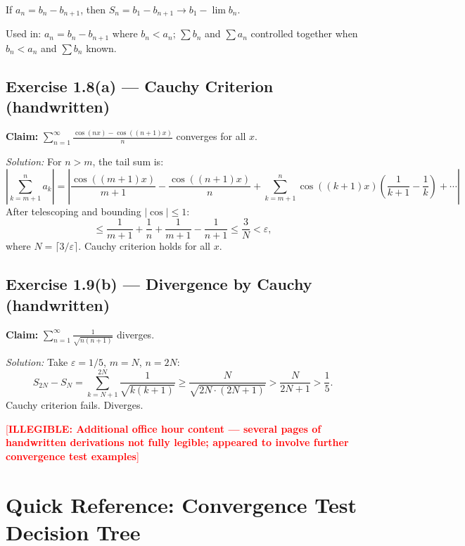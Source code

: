 \documentclass[12pt, a4paper]{article}
\newcommand{\illegible}[1][?]{\textcolor{red}{[\textbf{ILLEGIBLE: #1}]}}
\theoremstyle{definition}
\theoremstyle{remark}
\begin{document}
If $a_n = b_n - b_{n+1}$, then $S_n = b_1 - b_{n+1} \to b_1 - \lim b_n$.

Used in: $a_n = b_n - b_{n+1}$ where $b_n < a_n$; $\sum b_n$ and $\sum a_n$ controlled together when $b_n < a_n$ and $\sum b_n$ known.

\subsection{Exercise 1.8(a) --- Cauchy Criterion (handwritten)}

\noindent\textbf{Claim:} $\displaystyle\sum_{n=1}^\infty \frac{\cos(nx)-\cos((n+1)x)}{n}$ converges for all $x$.

\textit{Solution:} For $n > m$, the tail sum is:
\[
  \left|\sum_{k=m+1}^{n} a_k\right|
  = \left|\frac{\cos((m+1)x)}{m+1} - \frac{\cos((n+1)x)}{n} + \sum_{k=m+1}^{n}\cos((k+1)x)\left(\frac{1}{k+1}-\frac{1}{k}\right) + \cdots\right|
\]
After telescoping and bounding $|\cos| \leq 1$:
\[
  \leq \frac{1}{m+1} + \frac{1}{n} + \frac{1}{m+1} - \frac{1}{n+1} \leq \frac{3}{N} < \varepsilon,
\]
where $N = \lceil 3/\varepsilon \rceil$. Cauchy criterion holds for all $x$.

\subsection{Exercise 1.9(b) --- Divergence by Cauchy (handwritten)}

\noindent\textbf{Claim:} $\displaystyle\sum_{n=1}^\infty \frac{1}{\sqrt{n(n+1)}}$ diverges.

\textit{Solution:} Take $\varepsilon = 1/5$, $m = N$, $n = 2N$:
\[
  S_{2N} - S_N = \sum_{k=N+1}^{2N} \frac{1}{\sqrt{k(k+1)}}
  \geq \frac{N}{\sqrt{2N\cdot(2N+1)}} > \frac{N}{2N+1} > \frac{1}{5}.
\]
Cauchy criterion fails. Diverges.

\illegible[Additional office hour content --- several pages of handwritten derivations not fully legible; appeared to involve further convergence test examples]

\section{Quick Reference: Convergence Test Decision Tree}
\end{document}
